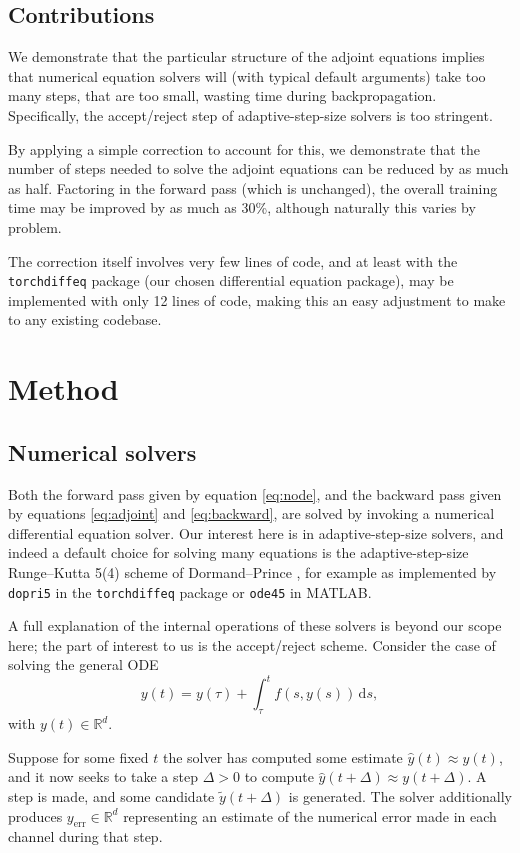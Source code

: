 \documentclass{article}
\theoremstyle{plain}
\theoremstyle{definition}
\newcommand{\reals}{\mathbb{R}}
\newcommand{\dd}{\mathrm{d}}
\begin{document}
\subsection{Contributions}
We demonstrate that the particular structure of the adjoint equations implies that numerical equation solvers will (with typical default arguments) take too many steps, that are too small, wasting time during backpropagation. Specifically, the accept/reject step of adaptive-step-size solvers is too stringent.

By applying a simple correction to account for this, we demonstrate that the number of steps needed to solve the adjoint equations can be reduced by as much as half. Factoring in the forward pass (which is unchanged), the overall training time may be improved by as much as 30\%, although naturally this varies by problem.

The correction itself involves very few lines of code, and at least with the \texttt{torchdiffeq} package (our chosen differential equation package), may be implemented with only 12 lines of code, making this an easy adjustment to make to any existing codebase.

\section{Method}
\subsection{Numerical solvers}
Both the forward pass given by equation \eqref{eq:node}, and the backward pass given by equations \eqref{eq:adjoint} and \eqref{eq:backward}, are solved by invoking a numerical differential equation solver. Our interest here is in adaptive-step-size solvers, and indeed a default choice for solving many equations is the adaptive-step-size Runge--Kutta 5(4) scheme of Dormand--Prince \citep{TODO}, for example as implemented by \texttt{dopri5} in the \texttt{torchdiffeq} package or \texttt{ode45} in MATLAB.

A full explanation of the internal operations of these solvers is beyond our scope here; the part of interest to us is the accept/reject scheme. Consider the case of solving the general ODE
\begin{equation*}
y(t) = y(\tau) + \int_\tau^t f(s, y(s)) \,\dd s,
\end{equation*}
with $y(t) \in \reals^d$.

Suppose for some fixed $t$ the solver has computed some estimate $\widehat{y}(t) \approx y(t)$, and it now seeks to take a step $\Delta > 0$ to compute $\widehat{y}(t + \Delta) \approx y(t + \Delta)$. A step is made, and some candidate $\widetilde{y}(t + \Delta)$ is generated. The solver additionally produces $y_\text{err} \in \reals^d$ representing an estimate of the numerical error made in each channel during that step.
\end{document}
